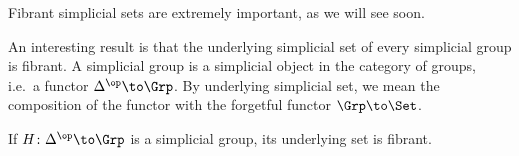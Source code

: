 \elemm

Fibrant simplicial sets are extremely important, as we will see soon.

An interesting result is that the underlying simplicial set of every simplicial group is fibrant.
A simplicial group is a simplicial object in the category of groups, i.e.\ a functor $\Delta^\op\to\Grp$.
By underlying simplicial set, we mean the composition of the functor with the forgetful functor $\Grp\to\Set$.

\blemm[title={Moore}]

    If $H\colon\Delta^\op\to\Grp$ is a simplicial group, its underlying set is fibrant.

\elemm

